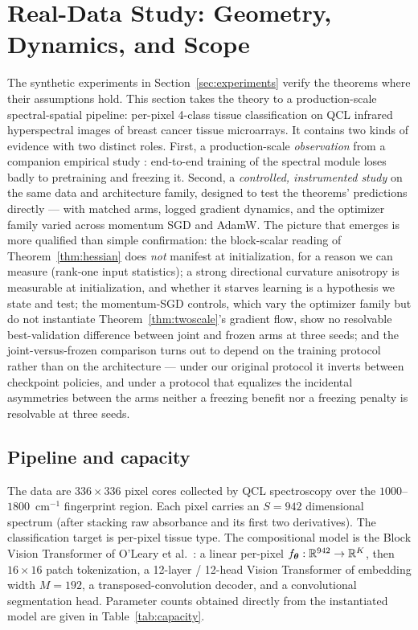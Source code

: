 \section{Real-Data Study: Geometry, Dynamics, and Scope}
\label{sec:real}

The synthetic experiments in Section~\ref{sec:experiments} verify the
theorems where their assumptions hold. This section takes the theory to
a production-scale spectral-spatial pipeline: per-pixel 4-class tissue
classification on QCL infrared hyperspectral images of breast cancer
tissue microarrays. It contains two kinds of evidence with two distinct
roles. First, a production-scale \emph{observation} from a companion
empirical study \citep{dziuba2026spatial}: end-to-end training of the
spectral module loses badly to pretraining and freezing it. Second, a
\emph{controlled, instrumented study} on the same data and architecture
family, designed to test the theorems' predictions directly --- with
matched arms, logged gradient dynamics, and the optimizer family varied
across momentum SGD and AdamW. The picture that emerges is more
qualified than simple confirmation: the block-scalar reading of
Theorem~\ref{thm:hessian} does \emph{not} manifest at initialization,
for a reason we can measure (rank-one input statistics); a strong
directional curvature anisotropy is measurable at initialization,
and whether it starves learning is a hypothesis we state and test; the
momentum-SGD controls, which vary the optimizer family but do not
instantiate Theorem~\ref{thm:twoscale}'s gradient flow, show no
resolvable best-validation difference between joint and frozen arms at
three seeds; and the joint-versus-frozen comparison turns out to depend
on the training
protocol rather than on the architecture --- under our original
protocol it inverts between checkpoint policies, and under a protocol
that equalizes the incidental asymmetries between the arms neither a
freezing benefit nor a freezing penalty is resolvable at three seeds.

\subsection{Pipeline and capacity}
\label{sec:real_setup}

The data are $336 \times 336$ pixel cores collected by QCL
spectroscopy over the $1000$--$1800$~cm$^{-1}$ fingerprint region.
Each pixel carries an $S = 942$ dimensional spectrum (after stacking
raw absorbance and its first two derivatives). The classification
target is per-pixel tissue type. The compositional model is the Block
Vision Transformer of O'Leary et al.~\cite{oleary2026spatial}: a
linear per-pixel $f_{\boldsymbol{\theta}}: \mathbb{R}^{942} \to \mathbb{R}^{K}$, then $16 \times 16$
patch tokenization, a 12-layer / 12-head Vision Transformer of
embedding width $M = 192$, a transposed-convolution decoder, and a
convolutional segmentation head. Parameter counts obtained directly
from the instantiated model are given in Table~\ref{tab:capacity}.

